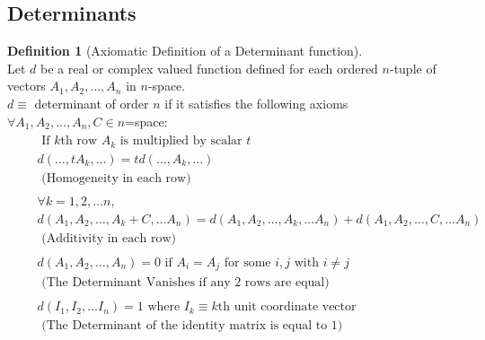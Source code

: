 \documentclass[twoside]{amsart}
\theoremstyle{plain}
\theoremstyle{definition}
\newtheorem{definition}{Definition}
\begin{document}
\subsection{Determinants}
\begin{definition}[Axiomatic Definition of a Determinant function]\label{D:Axiomatic_Definition_of_Determinants} \quad \\
  Let $d$ be a real or complex valued function defined for each ordered $n$-tuple of vectors $A_1,A_2,\dots , A_n$ in $n$-space.  \\
  $d \equiv $ determinant of order $n$ if it satisfies the following axioms $\forall A_1,A_2, \dots ,A_n,C \in n$=space:
  \begin{align}
    & 
    \begin{aligned}
      & \text{ If $k$th row $A_k$ is multiplied by scalar $t$ }  \\
      & d(\dots , t A_k , \dots) = t d(\dots , A_k , \dots )   \\
      & \text{ (Homogeneity in each row) } 
    \end{aligned}  
    \label{E:Determinants_Homogeneity_in_each_row} \\
    & 
    \begin{aligned}
      & \forall k = 1,2, \dots n,   \\
      & d(A_1,A_2, \dots , A_k + C, \dots A_n) = d(A_1,A_2, \dots , A_k , \dots A_n ) + d(A_1, A_2, \dots , C , \dots A_n )  \\
      & \text{ (Additivity in each row)}
    \end{aligned}
    \label{E:Determinants_Additivity_in_each_row} \\
    & 
    \begin{aligned}
      & d(A_1, A_2 , \dots , A_n) = 0 \text{ if } A_i = A_j \text{ for some $i,j$ with $i\neq j$ }  \\
      & \text{ (The Determinant Vanishes if any 2 rows are equal) } 
    \end{aligned}
    \label{E:Determinant_equal_rows} \\
    & 
    \begin{aligned}
      & d(I_1 ,I_2 , \dots I_n ) = 1 \text{ where } I_k \equiv k\text{th unit coordinate vector}  \\
      & \text{ (The Determinant of the identity matrix is equal to 1) } 
    \end{aligned}
    \label{E:Determinant_Identity} 
  \end{align}
  

\end{definition}
\end{document}
